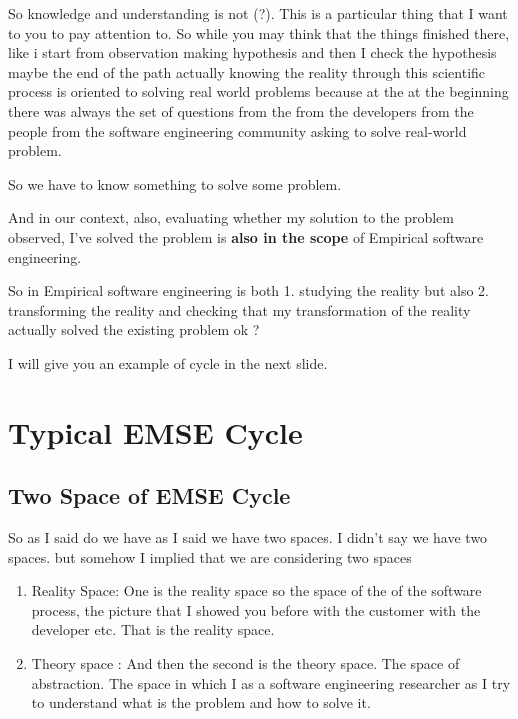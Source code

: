 \documentclass[conference, compsoc, twoside]{IEEEtran}
\begin{document}
So knowledge and understanding is not (?).
This is a particular thing that I want to you to pay attention to.
So while you may think that the things finished there, like 
i start from observation 
making hypothesis 
and then I check the hypothesis 
maybe the end of the path actually knowing the reality through this scientific process is oriented to solving real world problems because at the at the beginning there was always the set of questions from the from the developers from the people from the software engineering community asking to solve real-world problem.

So we have to know something to solve some problem.

And in our context, also, evaluating whether my solution to the problem observed, I've solved the problem is \textbf{also in the scope} of Empirical software engineering.

So in Empirical software engineering is both 
1. studying the reality but also 
2. transforming the reality and checking that my transformation of the reality actually solved the existing problem ok ? 

I will give you an example of cycle in the next slide. 

\section{Typical EMSE Cycle} %

\subsection{Two Space of EMSE Cycle} %
 So as I said do we have as I said we have two spaces. I didn't say we have two spaces. but somehow I implied that we are considering two spaces 
 \begin{enumerate}
 	\item Reality Space: One is the reality space so the space of the of the software process, the picture that I showed you before with the customer with the developer etc. That is the reality space.
 	\item Theory space : And then the second is the theory space. The space of abstraction. The space in which I as a software engineering researcher as I try to understand what is the problem and how to solve it. 
 \end{enumerate}
\end{document}

